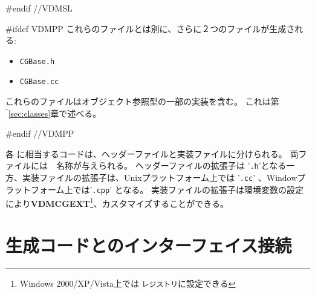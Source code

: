 \documentclass[\pformat,12pt]{jarticle}
\begin{document}
#endif //VDMSL

#ifdef VDMPP
これらのファイルとは別に、さらに２つのファイルが生成される:
\begin{itemize}
\item \texttt{CGBase.h}
\item \texttt{CGBase.cc}
\end{itemize}

これらのファイルはオブジェクト参照型の一部の実装を含む。 
これは第‾\ref{sec:classes}章で述べる。

%

#endif //VDMPP

各 \VDM{} に相当するコードは、ヘッダーファイルと実装ファイルに分けられる。
両ファイルには　名称が与えられる。
ヘッダーファイルの拡張子は '\texttt{.h}'となる一方、実装ファイルの拡張子は、Unixプラットフォーム上では '\texttt{.cc}' 、Windowプラットフォーム上では'\texttt{.cpp}' となる。
実装ファイルの拡張子は環境変数の設定により{\bf VDMCGEXT}\footnote{Windows 2000/XP/Vista上では \texttt{レジストリ}に設定できる}、カスタマイズすることができる。

\section{生成コードとのインターフェイス接続}\label{interfacing}
\end{document}
